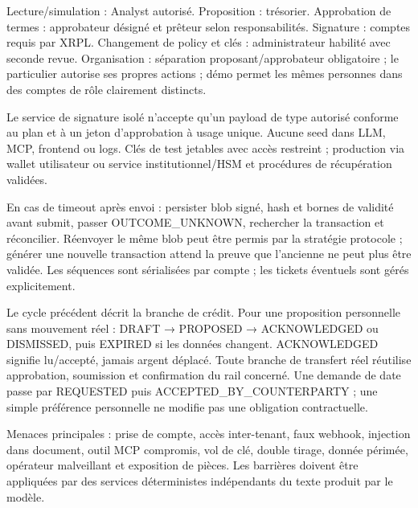 \documentclass[10pt,a4paper]{article}
\makeatletter
\renewcommand\section{\@startsection{section}{1}{0pt}{16pt plus 2pt minus 1pt}{8pt}{\displayfont\fontsize{16}{20}\selectfont\color{forest}}}
\makeatother
\begin{document}
Lecture/simulation : Analyst autorisé. Proposition : trésorier. Approbation de termes : approbateur désigné et prêteur selon responsabilités. Signature : comptes requis par XRPL. Changement de policy et clés : administrateur habilité avec seconde revue. Organisation : séparation proposant/approbateur obligatoire ; le particulier autorise ses propres actions ; démo permet les mêmes personnes dans des comptes de rôle clairement distincts.\par

Le service de signature isolé n'accepte qu'un payload de type autorisé conforme au plan et à un jeton d'approbation à usage unique. Aucune seed dans LLM, MCP, frontend ou logs. Clés de test jetables avec accès restreint ; production via wallet utilisateur ou service institutionnel/HSM et procédures de récupération validées.\par

En cas de timeout après envoi : persister blob signé, hash et bornes de validité avant submit, passer OUTCOME\_\allowbreak UNKNOWN, rechercher la transaction et réconcilier. Réenvoyer le même blob peut être permis par la stratégie protocole ; générer une nouvelle transaction attend la preuve que l'ancienne ne peut plus être validée. Les séquences sont sérialisées par compte ; les tickets éventuels sont gérés explicitement.\par

Le cycle précédent décrit la branche de crédit. Pour une proposition personnelle sans mouvement réel : DRAFT → PROPOSED → ACKNOWLEDGED ou DISMISSED, puis EXPIRED si les données changent. ACKNOWLEDGED signifie lu/accepté, jamais argent déplacé. Toute branche de transfert réel réutilise approbation, soumission et confirmation du rail concerné. Une demande de date passe par REQUESTED puis ACCEPTED\_\allowbreak BY\_\allowbreak COUNTERPARTY ; une simple préférence personnelle ne modifie pas une obligation contractuelle.\par

\section{Sécurité et menaces}\label{ch:21}
Menaces principales : prise de compte, accès inter-tenant, faux webhook, injection dans document, outil MCP compromis, vol de clé, double tirage, donnée périmée, opérateur malveillant et exposition de pièces. Les barrières doivent être appliquées par des services déterministes indépendants du texte produit par le modèle.\par
\end{document}
